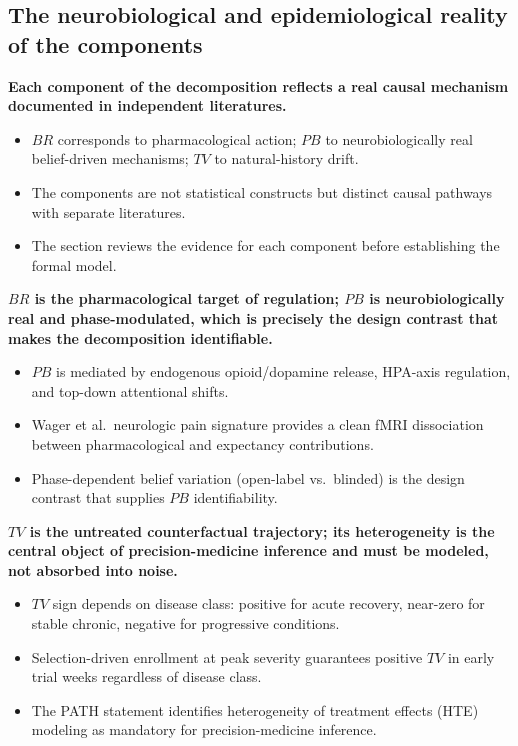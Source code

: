 \documentclass[
  11pt,
]{article}
\begin{document}
\subsection{The neurobiological and epidemiological reality of the components}\label{the-neurobiological-and-epidemiological-reality-of-the-components}

\textbf{Each component of the decomposition reflects a real causal mechanism documented in independent literatures.}

\begin{itemize}\setlength{\itemsep}{2pt}\setlength{\parskip}{0pt}
\item $BR$ corresponds to pharmacological action; $PB$ to neurobiologically real belief-driven mechanisms; $TV$ to natural-history drift.
\item The components are not statistical constructs but distinct causal pathways with separate literatures.
\item The section reviews the evidence for each component before establishing the formal model.
\end{itemize}

\textbf{$BR$ is the pharmacological target of regulation; $PB$ is neurobiologically real and phase-modulated, which is precisely the design contrast that makes the decomposition identifiable.}

\begin{itemize}\setlength{\itemsep}{2pt}\setlength{\parskip}{0pt}
\item $PB$ is mediated by endogenous opioid/dopamine release, HPA-axis regulation, and top-down attentional shifts.
\item Wager et al.\ neurologic pain signature provides a clean fMRI dissociation between pharmacological and expectancy contributions.
\item Phase-dependent belief variation (open-label vs.\ blinded) is the design contrast that supplies $PB$ identifiability.
\end{itemize}

\textbf{$TV$ is the untreated counterfactual trajectory; its heterogeneity is the central object of precision-medicine inference and must be modeled, not absorbed into noise.}

\begin{itemize}\setlength{\itemsep}{2pt}\setlength{\parskip}{0pt}
\item $TV$ sign depends on disease class: positive for acute recovery, near-zero for stable chronic, negative for progressive conditions.
\item Selection-driven enrollment at peak severity guarantees positive $TV$ in early trial weeks regardless of disease class.
\item The PATH statement identifies heterogeneity of treatment effects (HTE) modeling as mandatory for precision-medicine inference.
\end{itemize}
\end{document}
